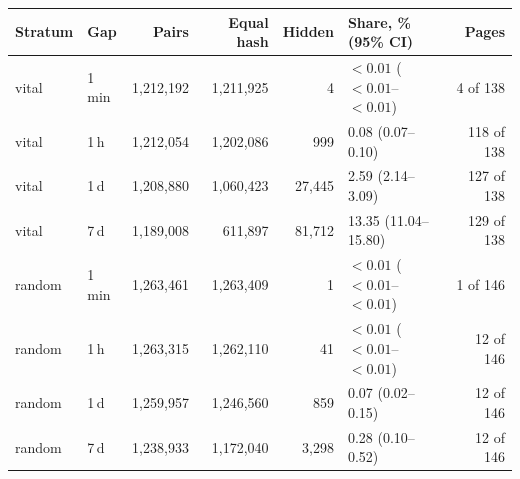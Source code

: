 \begin{tabular}{@{}llrrrlr@{}}
\toprule
Stratum & Gap & Pairs & Equal hash & Hidden & Share, \% (95\% CI) & Pages \\
\midrule
vital & 1\,min & 1,212,192 & 1,211,925 & 4 & ${<}0.01$ (${<}0.01$--${<}0.01$) & 4 of 138 \\
vital & 1\,h & 1,212,054 & 1,202,086 & 999 & 0.08 (0.07--0.10) & 118 of 138 \\
vital & 1\,d & 1,208,880 & 1,060,423 & 27,445 & 2.59 (2.14--3.09) & 127 of 138 \\
vital & 7\,d & 1,189,008 & 611,897 & 81,712 & 13.35 (11.04--15.80) & 129 of 138 \\
random & 1\,min & 1,263,461 & 1,263,409 & 1 & ${<}0.01$ (${<}0.01$--${<}0.01$) & 1 of 146 \\
random & 1\,h & 1,263,315 & 1,262,110 & 41 & ${<}0.01$ (${<}0.01$--${<}0.01$) & 12 of 146 \\
random & 1\,d & 1,259,957 & 1,246,560 & 859 & 0.07 (0.02--0.15) & 12 of 146 \\
random & 7\,d & 1,238,933 & 1,172,040 & 3,298 & 0.28 (0.10--0.52) & 12 of 146 \\
\bottomrule
\end{tabular}
